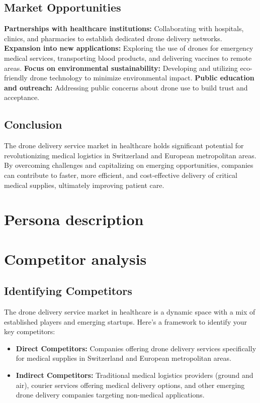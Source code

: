 \subsection{Market Opportunities}
\textbf{Partnerships with healthcare institutions:} Collaborating with hospitals, clinics, and pharmacies to establish dedicated drone delivery networks. \cite{fortunebusinessinsights_2023_medical}
\newline
\textbf{Expansion into new applications:} Exploring the use of drones for emergency medical services, transporting blood products, and delivering vaccines to remote areas. \cite{fortunebusinessinsights_2023_medical}
\newline
\textbf{Focus on environmental sustainability:} Developing and utilizing eco-friendly drone technology to minimize environmental impact. \cite{fortunebusinessinsights_2023_medical}
\newline
\textbf{Public education and outreach:} Addressing public concerns about drone use to build trust and acceptance. \cite{fortunebusinessinsights_2023_medical}
\subsection{Conclusion}
The drone delivery service market in healthcare holds significant potential for revolutionizing medical logistics in Switzerland and European metropolitan areas. By overcoming challenges and capitalizing on emerging opportunities, companies can contribute to faster, more efficient, and cost-effective delivery of critical medical supplies, ultimately improving patient care.
\section{Persona description}
\section{Competitor analysis}
\subsection{Identifying Competitors}
The drone delivery service market in healthcare is a dynamic space with a mix of established players and emerging startups. Here's a framework to identify your key competitors:
\begin{itemize}
  \item \textbf{Direct Competitors:} Companies offering drone delivery services specifically for medical supplies in Switzerland and European metropolitan areas.
  \item \textbf{Indirect Competitors:} Traditional medical logistics providers (ground and air), courier services offering medical delivery options, and other emerging drone delivery companies targeting non-medical applications.
\end{itemize}

